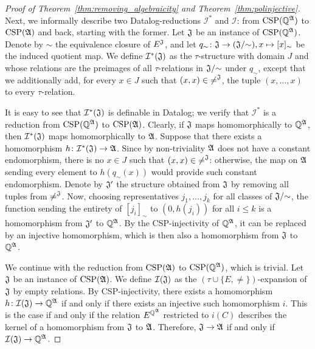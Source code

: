\begin{proof}[Proof of Theorem~\ref{thm:removing_algebraicity} and Theorem~\ref{thm:polinjective}]
Next, we informally describe two Datalog-reductions $\mathcal{I}^{\ast}$ and $\mathcal{I}$: from $\mathrm{CSP}(\mathbb{Q}^{\mathfrak{A}})$ to $\mathrm{CSP}(\mathfrak{A})$ and back, starting with the former. 
%  
Let $\mathfrak{J}$ be an instance of $\mathrm{CSP}(\mathbb{Q}^{\mathfrak{A}})$.
%
Denote by $\sim$ the equivalence closure of $E^{\mathfrak{J}}$, and let $q_{\sim}\colon \mathfrak{J}\rightarrow (\mathfrak{J}/{\sim}), x \mapsto [x]_{\sim}$ be the induced quotient map.
%
We define $\mathcal{I}^{\ast}(\mathfrak{J})$ as the $\tau$-structure with domain $J$ and whose relations are the preimages of all $\tau$-relations in $\mathfrak{J}/{\sim}$ under $q_{\sim}$, except that we additionally add, for every $x\in J$ such that $(x,x)\in {\neq}^{\mathfrak{J}}$, the tuple $(x,\dots, x)$ to every $\tau$-relation.

It is easy to see that $\mathcal{I}^{\ast}(\mathfrak{J})$ is definable in Datalog; we verify that $\mathcal{I}^{\ast}$ is a reduction from $\mathrm{CSP}(\mathbb{Q}^{\mathfrak{A}})$ to $\mathrm{CSP}(\mathfrak{A})$. 
%
Clearly, if $\mathfrak{J}$ maps homomorphically to $\mathbb{Q}^{\mathfrak{A}}$, then $\mathcal{I}^{\ast}(\mathfrak{J})$ maps homomorphically to $\mathfrak{A}$.
%
Suppose that there exists a homomorphism $h\colon \mathcal{I}^{\ast}(\mathfrak{J})\rightarrow\mathfrak{A}$.
%
Since by non-triviality $\mathfrak{A}$ does not have a constant endomorphism, there is no $x\in J$ such that $(x,x)\in {\neq}^{\mathfrak{J}}$: otherwise, the map on $\mathfrak{A}$ sending every element to $h(q_\sim(x))$ would provide such constant endomorphism.
%
Denote by $\mathfrak{J}'$ the structure obtained from $\mathfrak{J}$ by removing all tuples from ${\neq}^{\mathfrak{J}}$.
%
Now, choosing representatives $j_1,\dots,j_k$ for all classes of $\mathfrak{J}/{\sim}$, the function sending the entirety of $[j_i]_\sim$ to $(0,h(j_i))$ for all $i\leq k$ is a homomorphism from $\mathfrak{J}'$ to $\mathbb{Q}^{\mathfrak{A}}$.
%
By the CSP-injectivity of $\mathbb{Q}^{\mathfrak{A}}$, it can be replaced by an injective homomorphism, which is then also a homomorphism from $\mathfrak{J}$ to $\mathbb{Q}^{\mathfrak{A}}$.

We continue with the reduction from $\mathrm{CSP}(\mathfrak{A})$ to $\mathrm{CSP}(\mathbb{Q}^{\mathfrak{A}})$, which is trivial.
%
Let $\mathfrak{J}$ be an instance of $\mathrm{CSP}(\mathfrak{A})$.
%
We define $\mathcal{I}(\mathfrak{J})$ as the $(\tau\cup \{E,\neq\})$-expansion of $\mathfrak{J}$ by empty relations.
%
By CSP-injectivity, there exists a homomorphism $h\colon \mathcal{I}(\mathfrak{J}) \rightarrow \mathbb{Q}^{\mathfrak{A}}$ if and only if there exists an injective such homomorphism $i$.
%
This is the case if and only if the relation $E^{\mathbb{Q}^{\mathfrak{A}}}$ restricted to $i(C)$ describes the kernel of a homomorphism from  $\mathfrak{J}$ to $\mathfrak{A}$.
Therefore, $\mathfrak{J}\rightarrow\mathfrak{A}$ if and only if $\mathcal{I}(\mathfrak{J})\rightarrow\mathbb{Q}^{\mathfrak{A}}$. 
 

\end{proof}
